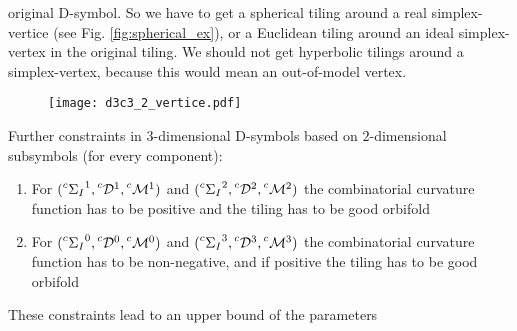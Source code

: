 \begin{frame}
\begin{itemize}
{	original D-symbol. So we have to get a spherical tiling around a real
	simplex-vertice (see Fig. \ref{fig:spherical_ex}), or a Euclidean tiling
	around an ideal simplex-vertex in the original tiling. We should not get
	hyperbolic tilings around a simplex-vertex, because this would mean an
	out-of-model vertex.}
    \end{itemize}
    \begin{figure}
      \center
      \texttt{[image: d3c3\_2\_vertice.pdf]}
    \end{figure}
\end{frame}

\begin{frame}
  Further constraints in $3$-dimensional D-symbols based on $2$-dimensional
  subsymbols (for every component):
  \begin{enumerate}
    \item For
      $(\leftexp{c}{\Sigma_I}^1,\leftexp{c}{\mathcal{D}}^1,\leftexp{c}{\mathcal{M}}^1)$ and
      $(\leftexp{c}{\Sigma_I}^2,\leftexp{c}{\mathcal{D}}^2,\leftexp{c}{\mathcal{M}}^2)$ the combinatorial curvature
      function has to be positive and the tiling has to be good
      orbifold
    \item For
      $(\leftexp{c}{\Sigma_I}^0,\leftexp{c}{\mathcal{D}}^0,\leftexp{c}{\mathcal{M}}^0)$ and
      $(\leftexp{c}{\Sigma_I}^3,\leftexp{c}{\mathcal{D}}^3,\leftexp{c}{\mathcal{M}}^3)$ the combinatorial curvature 
      function has to be non-negative, and if positive the tiling has to be good
      orbifold
  \end{enumerate}
  These constraints lead to an upper bound of the parameters 
\end{frame}

